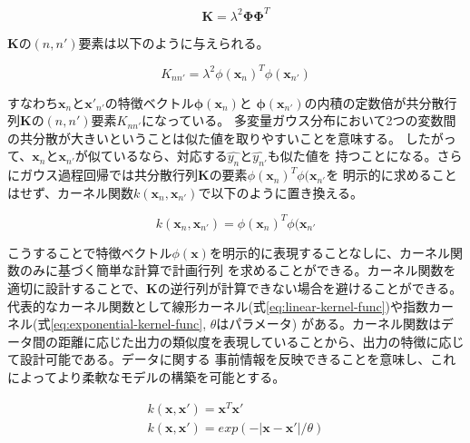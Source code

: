 \begin{equation}
\boldsymbol{K} = \lambda^2\boldsymbol{\Phi}\boldsymbol{\Phi}^T
\end{equation}

$\boldsymbol{K}$の$(n,n')$要素は以下のように与えられる。

\begin{equation}
K_{nn'} = \lambda^2\phi(\boldsymbol{x}_{n})^T\phi(\boldsymbol{x}_{n'})
\end{equation}

すなわち$\boldsymbol{x}_{n}$と$\boldsymbol{x'}_{n'}$の特徴ベクトル$\boldsymbol{\phi}(\boldsymbol{x}_{n})$と
$\boldsymbol{\phi}(\boldsymbol{x}_{n'})$の内積の定数倍が共分散行列$\boldsymbol{K}$の$(n,n')$要素$K_{nn'}$になっている。
多変量ガウス分布において2つの変数間の共分散が大きいということは似た値を取りやすいことを意味する。
したがって、$\boldsymbol{x}_{n}$と$\boldsymbol{x}_{n'}$が似ているなら、対応する$\hat{y_{n}}$と$\hat{y_{n'}}$も似た値を
持つことになる。さらにガウス過程回帰では共分散行列$\boldsymbol{K}$の要素$\phi(\boldsymbol{x}_{n})^T\phi(\boldsymbol{x}_{n'}$を
明示的に求めることはせず、カーネル関数$k(\boldsymbol{x}_{n}, \boldsymbol{x}_{n'})$で以下のように置き換える。

\begin{equation}
k(\boldsymbol{x}_{n}, \boldsymbol{x}_{n'}) = \phi(\boldsymbol{x}_{n})^T\phi(\boldsymbol{x}_{n'} 
\end{equation}

こうすることで特徴ベクトル$\phi(\boldsymbol{x})$を明示的に表現することなしに、カーネル関数のみに基づく簡単な計算で計画行列
を求めることができる。カーネル関数を適切に設計することで、$\boldsymbol{K}$の逆行列が計算できない場合を避けることができる。
代表的なカーネル関数として線形カーネル(式\ref{eq:linear-kernel-func})や指数カーネル(式\ref{eq:exponential-kernel-func}, $\theta$はパラメータ)
がある。カーネル関数はデータ間の距離に応じた出力の類似度を表現していることから、出力の特徴に応じて設計可能である。データに関する
事前情報を反映できることを意味し、これによってより柔軟なモデルの構築を可能とする。

\begin{gather}
k(\boldsymbol{x}, \boldsymbol{x'}) = \boldsymbol{x}^T\boldsymbol{x'} \label{eq:linear-kernel-func} \\
k(\boldsymbol{x}, \boldsymbol{x'}) = exp(-|\boldsymbol{x} - \boldsymbol{x'}|/\theta) \label{eq:exponential-kernel-func}
\end{gather}

